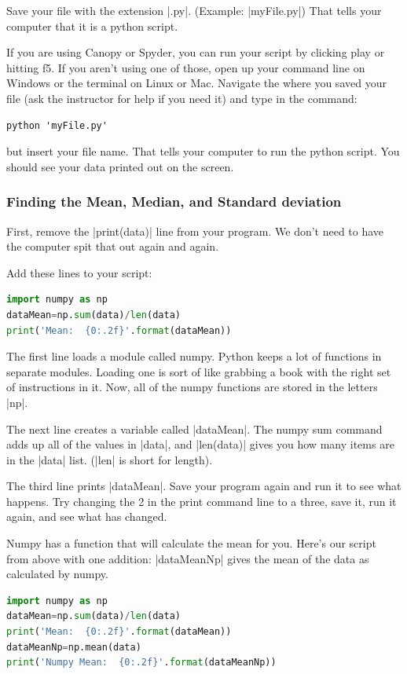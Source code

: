 \documentclass{book}%
\begin{document}
Save your file with the extension |.py|. (Example: |myFile.py|)  That tells your computer that it is a python script.

If you are using Canopy or Spyder, you can run your script by clicking play or hitting f5.  If you aren't using one of those, open up your command line on Windows or the terminal on Linux or Mac.  Navigate the where you saved your file (ask the instructor for help if you need it) and type in the command:
\begin{lstlisting}
python 'myFile.py'
\end{lstlisting}
but insert your file name. That tells your computer to run the python script.  You should see your data printed out on the screen.

\subsubsection{Finding the Mean, Median, and Standard deviation}

First, remove the |print(data)| line from your program. We don't need to have the computer spit that out again and again.  

Add these lines to your script:
\begin{lstlisting}[language=python]
import numpy as np
dataMean=np.sum(data)/len(data)
print('Mean:  {0:.2f}'.format(dataMean))
\end{lstlisting}

The first line loads a module called numpy.  Python keeps a lot of functions in separate modules.  Loading one is sort of like grabbing a book with the right set of instructions in it.  Now, all of the numpy functions are stored in the letters |np|.

The next line creates a variable called |dataMean|. The numpy sum command adds up all of the values in |data|, and |len(data)| gives you how many items are in the |data| list. (|len| is short for length).  

The third line prints |dataMean|.  Save your program again and run it to see what happens.  Try changing the 2 in the print command line to a three, save it, run it again, and see what has changed.

Numpy has a function that will calculate the mean for you.  Here's our script from above with one addition: |dataMeanNp| gives the mean of the data as calculated by numpy.
\begin{lstlisting}[language=python]
import numpy as np
dataMean=np.sum(data)/len(data)
print('Mean:  {0:.2f}'.format(dataMean))
dataMeanNp=np.mean(data)
print('Numpy Mean:  {0:.2f}'.format(dataMeanNp))
\end{lstlisting}
\end{document}
